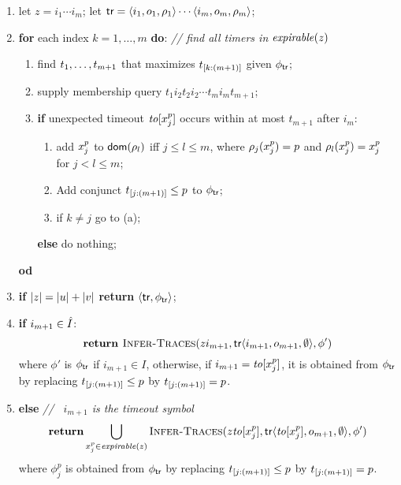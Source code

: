 \begin{enumerate}
\item
  let $z = i_1 \cdots i_m$;
  let $\textsf{tr} = \langle i_1,o_1,\rho_1\rangle\cdots\langle i_m,o_m,\rho_m\rangle$;
\item
  {\bf for} each index $k = 1, \ldots , m$ {\bf do}:
     \qquad \textit{// find all timers in $\mathit{expirable}(z)$}
  \begin{enumerate}
  \item
    find ${t}_1 , \ldots , {t}_{{m+1}}$ that maximizes $t_{[k:(m+1)]}$ given
    $\phi_{\textsf{tr}}$;
  \item
    supply membership query $t_1i_2t_2i_2 \cdots t_mi_mt_{m+1}$;
  \item
    {\bf if} unexpected timeout $\mathit{to}[x_{j}^{p}]$ occurs within at most
    $t_{m+1}$ after $i_m$:
    \begin{enumerate}
    \item
      add $x_{j}^{p}$ to ${\textsf{dom}}(\rho_l)$ iff
$j \leq l \leq m$, where $\rho_j(x_{j}^{p}) = p$ and
      $\rho_l(x_{j}^{p}) = x_{j}^{p}$ for $j < l \leq m$;
    \item
      Add conjunct 
      $t_{[j:(m+1)]} \leq p$ to $\phi_{\textsf{tr}}$;
    \item if $k \neq j$ go to (a);
    \end{enumerate}
    {\bf else} do nothing;
  \end{enumerate}
  {\bf od}
\item
  {\bf if} $|z| = |u| + |v|$ {\bf return}
  $\langle \textsf{tr},\phi_{\textsf{tr}}\rangle$;
\item
  {\bf if} $i_{m+1} \in \hat{I}$:
  \[  \textbf{return } \textsc{Infer-Traces}(zi_{m+1},\textsf{tr}\langle i_{m+1},o_{m+1},\emptyset\rangle,\phi')
  \]
  where $\phi'$ is $\phi_{\textsf{tr}}$ if $i_{m+1} \in I$, otherwise, if
  $i_{m+1} = \mathit{to}[x_{j}^{p}]$, it is obtained from $\phi_{\textsf{tr}}$
  by replacing $t_{[j:(m+1)]} \leq p$ by $t_{[j:(m+1)]} = p$.
  \item
  {\bf else} \hspace*{4cm} \textit{// \ $i_{m+1}$ is the timeout symbol}
    \[
    \textbf{return} \mathop\bigcup_{x_{j}^{p} \in \mathit{expirable}(z)}
     \textsc{Infer-Traces}(z\mathit{to}[x_{j}^{p}],\textsf{tr}\langle \mathit{to}[x_{j}^{p}],o_{m+1},\emptyset\rangle,\phi')
     \]
  where  $\phi_j^p$ is obtained from $\phi_{\textsf{tr}}$
  by replacing $t_{[j:(m+1)]} \leq p$ by $t_{[j:(m+1)]} = p$.
\end{enumerate}
